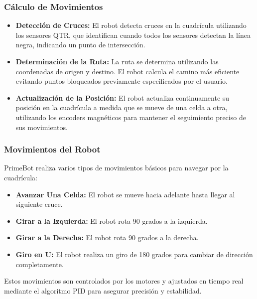 \subsubsection{Cálculo de Movimientos}
\begin{itemize}
	\item \textbf{Detección de Cruces:} El robot detecta cruces en la cuadrícula utilizando los sensores QTR, que identifican cuando todos los sensores detectan la línea negra, indicando un punto de intersección.

	\item \textbf{Determinación de la Ruta:} La ruta se determina utilizando las coordenadas de origen y destino. El robot calcula el camino más eficiente evitando puntos bloqueados previamente especificados por el usuario.

	\item \textbf{Actualización de la Posición:} El robot actualiza continuamente su posición en la cuadrícula a medida que se mueve de una celda a otra, utilizando los encoders magnéticos para mantener el seguimiento preciso de sus movimientos.
\end{itemize}

\subsubsection{Movimientos del Robot}
PrimeBot realiza varios tipos de movimientos básicos para navegar por la cuadrícula:
\begin{itemize}
	\item \textbf{Avanzar Una Celda:} El robot se mueve hacia adelante hasta llegar al siguiente cruce.
	\item \textbf{Girar a la Izquierda:} El robot rota 90 grados a la izquierda.
	\item \textbf{Girar a la Derecha:} El robot rota 90 grados a la derecha.
	\item \textbf{Giro en U:} El robot realiza un giro de 180 grados para cambiar de dirección completamente.
\end{itemize}
Estos movimientos son controlados por los motores y ajustados en tiempo real mediante el algoritmo PID para asegurar precisión y estabilidad.

